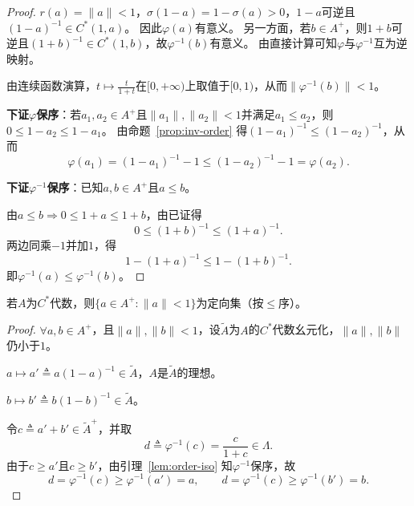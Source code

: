 \documentclass[lang=cn,a4paper,newtx,section]{elegantbook}
\begin{document}
  \begin{proof}
    $r(a) = \|a\| < 1$，$\sigma(1 - a) = 1 - \sigma(a) > 0$，$1 - a$可逆且$(1 - a)^{-1} \in C^*(1, a)$。
    因此$\varphi(a)$有意义。
    另一方面，若$b \in A^+$，则$1 + b$可逆且$(1 + b)^{-1} \in C^*(1, b)$，故$\varphi^{-1}(b)$有意义。
    由直接计算可知$\varphi$与$\varphi^{-1}$互为逆映射。
    
    由连续函数演算，$t \mapsto \frac{t}{1+t}$在$[0,+\infty)$上取值于$[0,1)$，从而$\|\varphi^{-1}(b)\| < 1$。
    
    \textbf{下证$\varphi$保序}：若$a_1, a_2 \in A^+$且$\|a_1\|, \|a_2\| < 1$并满足$a_1 \leq a_2$，则$0 \leq 1 - a_2 \leq 1 - a_1$。
    由命题~\ref{prop:inv-order} 得$(1 - a_1)^{-1} \leq (1 - a_2)^{-1}$，从而
    \begin{equation*}
      \varphi(a_1) = (1 - a_1)^{-1} - 1 \leq (1 - a_2)^{-1} - 1 = \varphi(a_2).
    \end{equation*}
    
    \textbf{下证$\varphi^{-1}$保序}：已知$a, b \in A^+$且$a \leq b$。
    
    由$a \leq b \Rightarrow 0 \leq 1 + a \leq 1 + b$，由已证得
    \begin{equation*}
      0 \leq (1 + b)^{-1} \leq (1 + a)^{-1}.
    \end{equation*}
    两边同乘$-1$并加$1$，得
    \begin{equation*}
      1 - (1 + a)^{-1} \leq 1 - (1 + b)^{-1}.
    \end{equation*}
    即$\varphi^{-1}(a) \leq \varphi^{-1}(b)$。
  \end{proof}
  
  \begin{theorem}
    若$A$为$C^*$代数，则$\{a \in A^+ : \|a\| < 1\}$为定向集（按$\leq$序）。
  \end{theorem}
  
  \begin{proof}
    $\forall a, b \in A^+$，且$\|a\|, \|b\| < 1$，设$\tilde{A}$为$A$的$C^*$代数幺元化，$\|a\|, \|b\|$仍小于$1$。
    
    $a \mapsto a' \triangleq a(1 - a)^{-1} \in \tilde{A}$，$A$是$\tilde{A}$的理想。
    
    $b \mapsto b' \triangleq b(1 - b)^{-1} \in \tilde{A}$。
    
    令$c \triangleq a' + b' \in \tilde{A}^+$，并取
    \begin{equation*}
      d \triangleq \varphi^{-1}(c) = \frac{c}{1 + c} \in \Lambda.
    \end{equation*}
    由于$c \geq a'$且$c \geq b'$，由引理~\ref{lem:order-iso} 知$\varphi^{-1}$保序，故
    \begin{equation*}
      d = \varphi^{-1}(c) \geq \varphi^{-1}(a') = a, \qquad d = \varphi^{-1}(c) \geq \varphi^{-1}(b') = b.
    \end{equation*}
  \end{proof}
  
\end{document}

